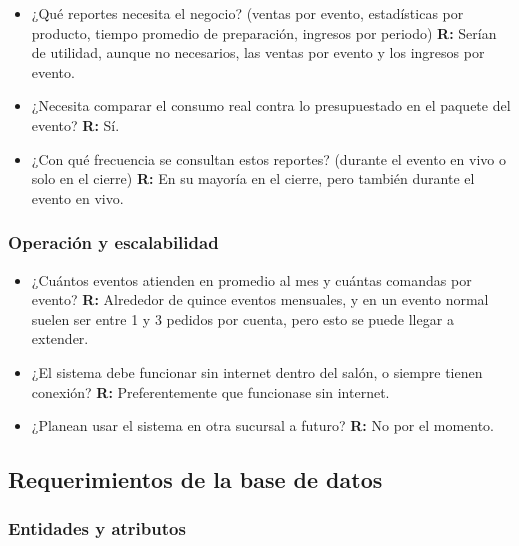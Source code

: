 \begin{itemize}
    \item ¿Qué reportes necesita el negocio? (ventas por evento, estadísticas por producto, tiempo promedio de preparación, ingresos por periodo)
    \subitem \textbf{R:} Serían de utilidad, aunque no necesarios, las ventas por evento y los ingresos por evento.

    \item ¿Necesita comparar el consumo real contra lo presupuestado en el paquete del evento?
    \subitem \textbf{R:} Sí.

    \item ¿Con qué frecuencia se consultan estos reportes? (durante el evento en vivo o solo en el cierre)
    \subitem \textbf{R:} En su mayoría en el cierre, pero también durante el evento en vivo.
\end{itemize}

\subsubsection{Operación y escalabilidad}

\begin{itemize}
    \item ¿Cuántos eventos atienden en promedio al mes y cuántas comandas por evento?
    \subitem \textbf{R:} Alrededor de quince eventos mensuales, y en un evento normal suelen ser entre 1 y 3 pedidos por cuenta, pero esto se puede llegar a extender.

    \item ¿El sistema debe funcionar sin internet dentro del salón, o siempre tienen conexión?
    \subitem \textbf{R:} Preferentemente que funcionase sin internet.

    \item ¿Planean usar el sistema en otra sucursal a futuro?
    \subitem \textbf{R:} No por el momento.
\end{itemize}

\newpage

\subsection{Requerimientos de la base de datos}

\subsubsection{Entidades y atributos}

